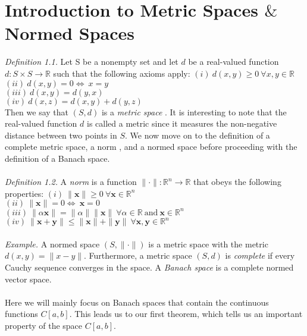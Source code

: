 \section{Introduction to Metric Spaces $\&$ Normed Spaces}
\emph{Definition 1.1.} Let S be a nonempty set and let $d$ be a real-valued function $d:S \times S \rightarrow \mathbb{R} $ such that the following axioms apply:\newline
$(i)\ d(x,y) \geq 0 \ \forall x,y \in \mathbb{R}$\\
$(ii)\ d(x,y)=0  \iff \ x=y$\\
$(iii)\ d(x,y)=d(y,x)$\\
$(iv)\ d(x,z)=d(x,y)+d(y,z)$\newline\\
Then we say that $(S,d)$ is a \emph{metric space} \cite{key7}. It is interesting to note that the real-valued function $d$ is called a metric since it measures the non-negative distance between two points in $S$. We now move on to the definition of a complete metric space, a norm \cite[pg. 438]{key3}, and a normed space before proceeding with the definition of a Banach space.
\\\\
\emph{Definition 1.2.} A \emph{norm} is a function $\|\cdot\|:\mathbb{R}^{n} \rightarrow \mathbb{R}$ that obeys the following properties:\newline
$(i)\ \|\textbf{x}\| \geq 0 \ \forall \textbf{x} \in \mathbb{R}^{n}$\\
$(ii)\ \|\textbf{x}\|=0  \iff \ \textbf{x}=0$\\
$(iii)\ \|\alpha\textbf{x}\| = \|\alpha\|\|\textbf{x}\| \ \forall \alpha \in \mathbb{R} \ \text{and} \ \textbf{x} \in \mathbb{R}^{n}$\\
$(iv)\ \|\textbf{x}+\textbf{y}\| \leq \|\textbf{x}\|+\|\textbf{y}\| \ \forall \textbf{x}, \textbf{y} \in \mathbb{R}^{n}$\newline
\\\\
\emph{Example.} A normed space $(S,\|\cdot\|)$ is a metric space with the metric $d(x,y)=\|x-y\|$. \newline
Furthermore, a metric space $(S,d)$ is \emph{complete} if every Cauchy sequence converges in the space. A \emph{Banach space} is a complete normed vector space.
\\\\
 Here we will mainly focus on Banach spaces that contain the continuous functions $C[a,b]$. This leads us to our first theorem, which tells us an important property of the space $C[a,b]$.
